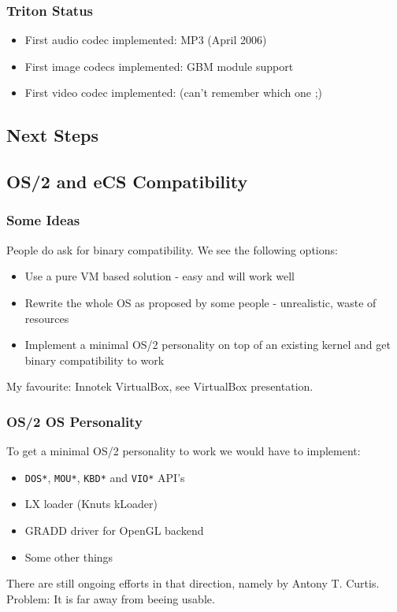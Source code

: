 \documentclass{beamer}
\begin{document}
\begin{frame}
\frametitle{Triton Status}
\begin{itemize}[<+->]
  \item First audio codec implemented: MP3 (April 2006)
  \item First image codecs implemented: GBM module support
  \item First video codec implemented: (can't remember which one ;)
\end{itemize}
\end{frame}

\subsection{Next Steps}

\subsection{OS/2 and eCS Compatibility}
\begin{frame}
\frametitle{Some Ideas}
People do ask for binary compatibility. We see the following options:
\begin{itemize}[<+->]
  \item Use a pure VM based solution - easy and will work well
  \item Rewrite the whole OS as proposed by some people - unrealistic, waste of resources
  \item Implement a minimal OS/2 personality on top of an existing kernel and get binary compatibility to work
\end{itemize}
My favourite: Innotek VirtualBox, see VirtualBox presentation.
\end{frame}

\begin{frame}
\frametitle{OS/2 OS Personality}
To get a minimal OS/2 personality to work we would have to implement:
\begin{itemize}[<+->]
  \item \texttt{DOS*}, \texttt{MOU*}, \texttt{KBD*} and \texttt{VIO*} API's
  \item LX loader (Knuts kLoader)
  \item GRADD driver for OpenGL backend
  \item Some other things
\end{itemize}
There are still ongoing efforts in that direction, namely by Antony T. Curtis.
Problem: It is far away from beeing usable.
\end{frame}
\end{document}
